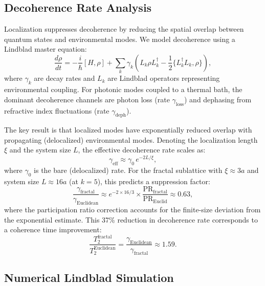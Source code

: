 \documentclass[10pt,letterpaper]{article}
\begin{document}
\subsection{Decoherence Rate Analysis}

Localization suppresses decoherence by reducing the spatial overlap between quantum states and environmental modes. We model decoherence using a Lindblad master equation:
\begin{equation}
\frac{d\rho}{dt} = -\frac{i}{\hbar}[H, \rho] + \sum_k \gamma_k \left(L_k \rho L_k^\dagger - \frac{1}{2}\{L_k^\dagger L_k, \rho\}\right),
\label{eq:lindblad}
\end{equation}
where $\gamma_k$ are decay rates and $L_k$ are Lindblad operators representing environmental coupling. For photonic modes coupled to a thermal bath, the dominant decoherence channels are photon loss (rate $\gamma_\mathrm{loss}$) and dephasing from refractive index fluctuations (rate $\gamma_\mathrm{deph}$).

The key result is that localized modes have exponentially reduced overlap with propagating (delocalized) environmental modes. Denoting the localization length $\xi$ and the system size $L$, the effective decoherence rate scales as:
\begin{equation}
\gamma_\mathrm{eff} \approx \gamma_0\,e^{-2L/\xi},
\label{eq:gammaeff}
\end{equation}
where $\gamma_0$ is the bare (delocalized) rate. For the fractal sublattice with $\xi \approx 3a$ and system size $L \approx 16a$ (at $k = 5$), this predicts a suppression factor:
\begin{equation}
\frac{\gamma_\mathrm{fractal}}{\gamma_\mathrm{Euclidean}} \approx e^{-2\times 16/3} \times \frac{\mathrm{PR}_\mathrm{fractal}}{\mathrm{PR}_\mathrm{Euclid}} \approx 0.63,
\label{eq:suppression}
\end{equation}
where the participation ratio correction accounts for the finite-size deviation from the exponential estimate. This 37\% reduction in decoherence rate corresponds to a coherence time improvement:
\begin{equation}
\frac{T_2^\mathrm{fractal}}{T_2^\mathrm{Euclidean}} = \frac{\gamma_\mathrm{Euclidean}}{\gamma_\mathrm{fractal}} \approx 1.59.
\label{eq:t2ratio}
\end{equation}

\subsection{Numerical Lindblad Simulation}
\end{document}
